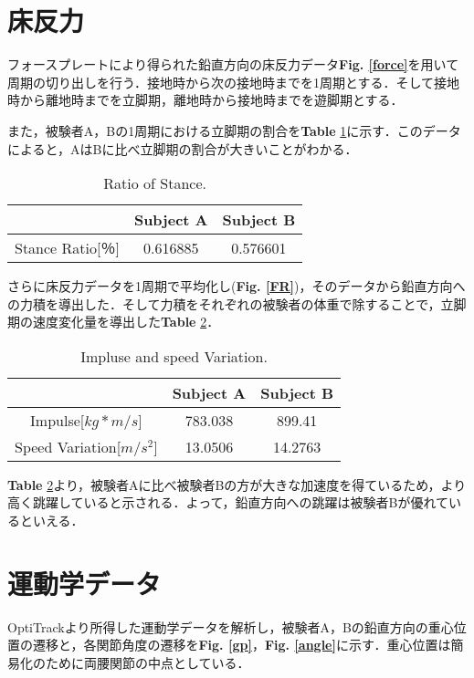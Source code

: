 \section{床反力}
フォースプレートにより得られた鉛直方向の床反力データ{\bf Fig. \ref{force}}を用いて周期の切り出しを行う．接地時から次の接地時までを1周期とする．そして接地時から離地時までを立脚期，離地時から接地時までを遊脚期とする．
 
 また，被験者A，Bの1周期における立脚期の割合を{\bf Table }\ref{stance}に示す．このデータによると，AはBに比べ立脚期の割合が大きいことがわかる．
 
\begin{table}[!h]
 \caption{Ratio of Stance.}
 \begin{center}
  \begin{tabular}{|c|c|c|} \hline
    & Subject A & Subject B \\ \hline \hline
  Stance Ratio[％] & 0.616885 & 0.576601 \\ \hline
  \end{tabular}
  \label{stance}
 \end{center}
\end{table}

さらに床反力データを1周期で平均化し({\bf Fig. \ref{FR}})，そのデータから鉛直方向への力積を導出した．そして力積をそれぞれの被験者の体重で除することで，立脚期の速度変化量を導出した{\bf Table }\ref{ISV}．
 
 \begin{table}[!h]
 \caption{Impluse and speed Variation.}
 \begin{center}
  \begin{tabular}{|c|c|c|} \hline
    & Subject A & Subject B \\ \hline \hline
   Impulse[$kg*m/s$] & 783.038 & 899.41 \\ \hline
  Speed Variation[$m/s^2$] & 13.0506 & 14.2763 \\ \hline
  \end{tabular}
  \label{ISV}
 \end{center}
\end{table}

{\bf Table }\ref{ISV}より，被験者Aに比べ被験者Bの方が大きな加速度を得ているため，より高く跳躍していると示される．よって，鉛直方向への跳躍は被験者Bが優れているといえる．

\newpage
\section{運動学データ}
OptiTrackより所得した運動学データを解析し，被験者A，Bの鉛直方向の重心位置の遷移と，各関節角度の遷移を{\bf Fig. \ref{gp}}，{\bf Fig. \ref{angle}}に示す．重心位置は簡易化のために両腰関節の中点としている．
 
